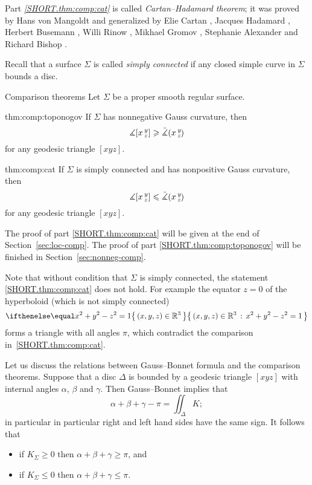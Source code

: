 Part \textit{\ref{SHORT.thm:comp:cat}} is called \emph{Cartan--Hadamard theorem};
it was proved by 
Hans von Mangoldt \cite{mangoldt} and generalized by Elie Cartan \cite{cartan}, Jacques Hadamard \cite{hadamard},
Herbert Busemann \cite{busemann},
Willi Rinow \cite{rinow},
Mikhael Gromov \cite[p.~119]{gromov},
Stephanie Alexander and Richard Bishop \cite{alexander-bishop1990}.

Recall that a surface $\Sigma$ is called {}\emph{simply connected} if any closed simple curve in $\Sigma$ bounds a disc.

\begin{thm}{Comparison theorems}\label{thm:comp}
Let $\Sigma$ be a proper smooth regular surface.

\begin{subthm}{thm:comp:toponogov}
If $\Sigma$ has nonnegative Gauss curvature, then 
 \[\measuredangle[x\,{}^{y}_{z}]\geqslant\tilde\measuredangle(x\,{}^{y}_{z}\hspace{-0.2ex})\]
for any geodesic triangle $[xyz]$.
\end{subthm}

\begin{subthm}{thm:comp:cat}
If $\Sigma$ is simply connected and has nonpositive Gauss curvature,
 then 
\[\measuredangle[x\,{}^{y}_{z}]\leqslant\tilde\measuredangle(x\,{}^{y}_{z}\hspace{-0.2ex})\]
for any geodesic triangle $[xyz]$.
\end{subthm}

\end{thm}

The proof of part \ref{SHORT.thm:comp:cat} will be given at the end of Section~\ref{sec:loc-comp}.
The proof of part \ref{SHORT.thm:comp:toponogov} will be finished in  Section~\ref{sec:nonneg-comp}.

Note that without condition that $\Sigma$ is simply connected, the statement \ref{SHORT.thm:comp:cat} does not hold.
For example the equator $z=0$ of the hyperboloid (which is not simply connected)
\[\set{(x,y,z)\in\RR^3}{x^2+y^2-z^2=1}\]
forms a triangle with all angles $\pi$, which contradict the comparison in~\ref{SHORT.thm:comp:cat}.

Let us discuss the relations between Gauss--Bonnet formula and the comparison theorems.
Suppose that a disc $\Delta$ is bounded by a geodesic triangle $[xyz]$ with internal angles $\alpha$, $\beta$ and $\gamma$.
Then Gauss--Bonnet implies that 
\[\alpha+\beta+\gamma-\pi=\iint_\Delta K;\]
in particular in particular right and left hand sides have the same sign.
It follows that
\begin{itemize}
\item if $K_\Sigma\ge 0$ then $\alpha+\beta+\gamma\ge\pi$, and
\item if $K_\Sigma\le 0$ then $\alpha+\beta+\gamma\le\pi$.
\end{itemize}

